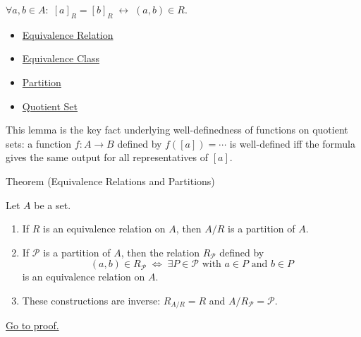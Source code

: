 \begin{remark*}
$\forall a, b \in A:\; [a]_R = [b]_R \;\leftrightarrow\; (a,b)\in R$.
\end{remark*}
\begin{dependencies}
\begin{itemize}
  \item \hyperref[def:equivalence-relation]{Equivalence Relation}
  \item \hyperref[def:equiv-class]{Equivalence Class}
  \item \hyperref[def:partition]{Partition}
  \item \hyperref[def:quotient-set]{Quotient Set}
\end{itemize}
\end{dependencies}

\begin{remark*}
This lemma is the key fact underlying well-definedness of functions on quotient
sets: a function $f : A \to B$ defined by $f([a]) = \cdots$ is well-defined
iff the formula gives the same output for all representatives of $[a]$.
\end{remark*}

\begin{theorembox}{Theorem (Equivalence Relations and Partitions)}
\begin{theorem}\label{thm:equiv-partition}
Let $A$ be a set.
\begin{enumerate}[label=(\roman*)]
\item If $R$ is an equivalence relation on $A$, then $A/R$ is a partition of $A$.
\item If $\mathcal{P}$ is a partition of $A$, then the relation
$R_{\mathcal{P}}$ defined by
\[
(a,b) \in R_{\mathcal{P}} \;\Longleftrightarrow\;
\exists P \in \mathcal{P} \text{ with } a \in P \text{ and } b \in P
\]
is an equivalence relation on $A$.
\item These constructions are inverse: $R_{A/R} = R$ and $A/R_{\mathcal{P}} = \mathcal{P}$.
\end{enumerate}
\hyperref[prf:equiv-partition]{Go to proof.}
\end{theorem}
\end{theorembox}

